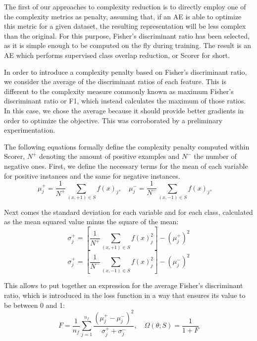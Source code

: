 The first of our approaches to complexity reduction is to directly employ one of the complexity metrics as penalty, assuming that, if an AE is able to optimize this metric for a given dataset, the resulting representation will be less complex than the original. For this purpose, Fisher's discriminant ratio has been selected, as it is simple enough to be computed on the fly during training. The result is an AE which performs supervised class overlap reduction, or Scorer for short.

In order to introduce a complexity penalty based on Fisher's discriminant ratio, we consider the average of the discriminant ratios of each feature. This is different to the complexity measure commonly known as maximum Fisher's discriminant ratio or F1, which instead calculates the maximum of those ratios. In this case, we chose the average because it should provide better gradients in order to optimize the objective. This was corroborated by a preliminary experimentation.

The following equations formally define the complexity penalty computed within Scorer, $N^+$ denoting the amount of positive examples and $N^-$ the number of negative ones. First, we define the necessary terms for the mean of each variable for positive instances and the same for negative instances.
\begin{equation} \mu_j^+ = \frac 1 {N^+} \sum_{(x,+1)\in S} f(x)_j,\quad \mu_j^- = \frac 1 {N^-} \sum_{(x,-1)\in S} f(x)_j,\quad\end{equation}

Next comes the standard deviation for each variable and for each class, calculated as the mean squared value minus the square of the mean:
\begin{equation}\sigma_j^+ = \left[\frac 1 {N^+} \sum_{(x,+1)\in S} f(x)_j^2\right] - (\mu_j^+)^2 \end{equation}
\begin{equation}\sigma_j^+ = \left[\frac 1 {N^-} \sum_{(x,-1)\in S} f(x)_j^2\right] - (\mu_j^-)^2 \end{equation}

This allows to put together an expression for the average Fisher's discriminant ratio, which is introduced in the loss function in a way that ensures its value to be between 0 and 1:
\begin{equation}F=\frac{1}{n_f}\sum_{j=1}^{n_f} \frac{(\mu_j^+-\mu_j^-)^2}{\sigma_j^++\sigma_j^-},\quad\Omega(\theta;S)=\frac{1}{1 + F}\end{equation}


